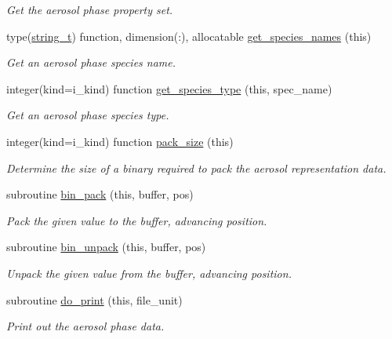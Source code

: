 \begin{DoxyCompactItemize}
\begin{DoxyCompactList}\small\item\em Get the aerosol phase property set. \end{DoxyCompactList}\item 
type(\mbox{\hyperlink{structpmc__util_1_1string__t}{string\+\_\+t}}) function, dimension(\+:), allocatable \mbox{\hyperlink{namespacepmc__aero__phase__data_a0bdb92ba2634d7c4b8d15b63baee4311}{get\+\_\+species\+\_\+names}} (this)
\begin{DoxyCompactList}\small\item\em Get an aerosol phase species name. \end{DoxyCompactList}\item 
integer(kind=i\+\_\+kind) function \mbox{\hyperlink{namespacepmc__aero__phase__data_afe51744f24e245997c36e00d63d577cf}{get\+\_\+species\+\_\+type}} (this, spec\+\_\+name)
\begin{DoxyCompactList}\small\item\em Get an aerosol phase species type. \end{DoxyCompactList}\item 
integer(kind=i\+\_\+kind) function \mbox{\hyperlink{namespacepmc__aero__phase__data_aa8dcbc0de2a9877abc2e6c0f833c8493}{pack\+\_\+size}} (this)
\begin{DoxyCompactList}\small\item\em Determine the size of a binary required to pack the aerosol representation data. \end{DoxyCompactList}\item 
subroutine \mbox{\hyperlink{namespacepmc__aero__phase__data_a3ee028d1595f33610a4359ddeb5fe249}{bin\+\_\+pack}} (this, buffer, pos)
\begin{DoxyCompactList}\small\item\em Pack the given value to the buffer, advancing position. \end{DoxyCompactList}\item 
subroutine \mbox{\hyperlink{namespacepmc__aero__phase__data_ab248ad8c703acdfc5f771aaca4671218}{bin\+\_\+unpack}} (this, buffer, pos)
\begin{DoxyCompactList}\small\item\em Unpack the given value from the buffer, advancing position. \end{DoxyCompactList}\item 
subroutine \mbox{\hyperlink{namespacepmc__aero__phase__data_aaf65be8c5ab43c4930479af66b8632b7}{do\+\_\+print}} (this, file\+\_\+unit)
\begin{DoxyCompactList}\small\item\em Print out the aerosol phase data. \end{DoxyCompactList}\item 

\end{DoxyCompactItemize}
